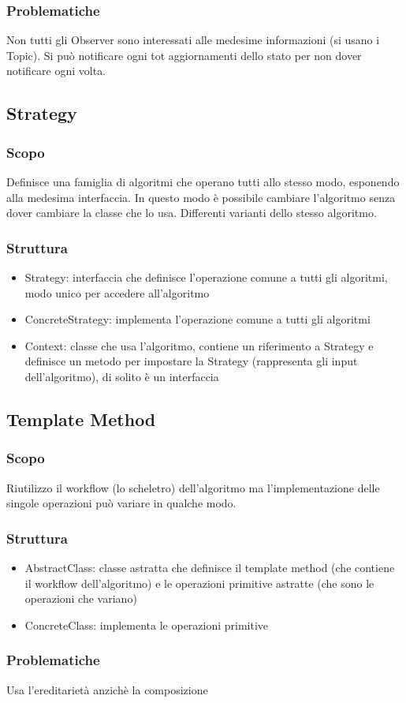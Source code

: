 \subsubsection{Problematiche}
Non tutti gli Observer sono interessati alle medesime informazioni (si usano i Topic). Si può notificare ogni tot aggiornamenti dello stato per non dover notificare ogni volta.

\subsection{Strategy}
\subsubsection{Scopo}
Definisce una famiglia di algoritmi che operano tutti allo stesso modo, esponendo alla medesima interfaccia. In questo modo è possibile cambiare l'algoritmo senza dover cambiare la classe che lo usa. Differenti varianti dello stesso algoritmo.
\subsubsection{Struttura}
\begin{itemize}
    \item Strategy: interfaccia che definisce l'operazione comune a tutti gli algoritmi, modo unico per accedere all'algoritmo
    \item ConcreteStrategy: implementa l'operazione comune a tutti gli algoritmi
    \item Context: classe che usa l'algoritmo, contiene un riferimento a Strategy e definisce un metodo per impostare la Strategy (rappresenta gli input dell'algoritmo), di solito è un interfaccia
\end{itemize}

\subsection{Template Method}
\subsubsection{Scopo}
Riutilizzo il workflow (lo scheletro) dell'algoritmo ma l'implementazione delle singole operazioni può variare in qualche modo.
\subsubsection{Struttura}
\begin{itemize}
    \item AbstractClass: classe astratta che definisce il template method (che contiene il workflow dell'algoritmo) e le operazioni primitive astratte (che sono le operazioni che variano)
    \item ConcreteClass: implementa le operazioni primitive
\end{itemize}
\subsubsection{Problematiche}
Usa l'ereditarietà anzichè la composizione
